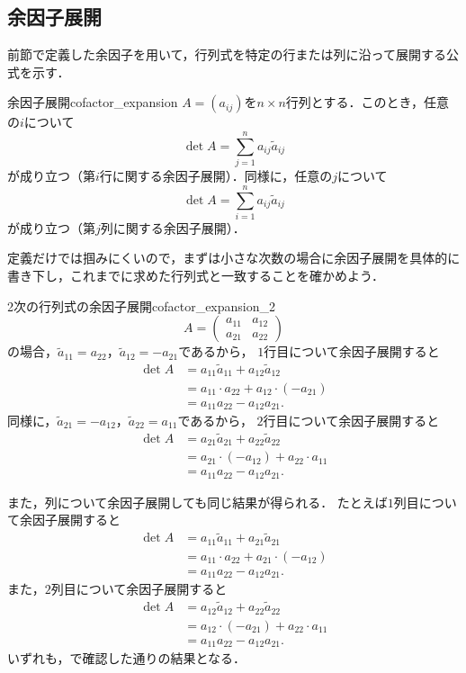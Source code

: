 \subsection{余因子展開}

前節で定義した余因子を用いて，行列式を特定の行または列に沿って展開する公式を示す．


\begin{prop}{余因子展開}{cofactor_expansion}
  $A = (a_{ij})$を$n \times n$行列とする．このとき，任意の$i$について
  \[
  \det A = \sum_{j=1}^{n} a_{ij} \tilde{a}_{ij}
  \]
  が成り立つ（第$i$行に関する余因子展開）．同様に，任意の$j$について
  \[
  \det A = \sum_{i=1}^{n} a_{ij} \tilde{a}_{ij}
  \]
  が成り立つ（第$j$列に関する余因子展開）．
\end{prop}

定義だけでは掴みにくいので，まずは小さな次数の場合に余因子展開を具体的に書き下し，これまでに求めた行列式と一致することを確かめよう．

\begin{example}{2次の行列式の余因子展開}{cofactor_expansion_2}
  \[
  A = \begin{pmatrix}
    a_{11} & a_{12} \\
    a_{21} & a_{22}
  \end{pmatrix}
  \]
  の場合，$\tilde{a}_{11} = a_{22}$，$\tilde{a}_{12} = -a_{21}$であるから，
  $1$行目について余因子展開すると
  \begin{align*}
    \det A
    &= a_{11}\tilde{a}_{11} + a_{12}\tilde{a}_{12} \\
    &= a_{11}\cdot a_{22} + a_{12}\cdot(-a_{21}) \\
    &= a_{11}a_{22} - a_{12}a_{21}.
  \end{align*}
  同様に，$\tilde{a}_{21} = -a_{12}$，$\tilde{a}_{22} = a_{11}$であるから，
  $2$行目について余因子展開すると
  \begin{align*}
    \det A
    &= a_{21}\tilde{a}_{21} + a_{22}\tilde{a}_{22} \\
    &= a_{21}\cdot(-a_{12}) + a_{22}\cdot a_{11} \\
    &= a_{11}a_{22} - a_{12}a_{21}.
  \end{align*}

  また，列について余因子展開しても同じ結果が得られる．
  たとえば$1$列目について余因子展開すると
  \begin{align*}
    \det A
    &= a_{11}\tilde{a}_{11} + a_{21}\tilde{a}_{21} \\
    &= a_{11}\cdot a_{22} + a_{21}\cdot(-a_{12}) \\
    &= a_{11}a_{22} - a_{12}a_{21}.
  \end{align*}
  また，$2$列目について余因子展開すると
  \begin{align*}
    \det A
    &= a_{12}\tilde{a}_{12} + a_{22}\tilde{a}_{22} \\
    &= a_{12}\cdot(-a_{21}) + a_{22}\cdot a_{11} \\
    &= a_{11}a_{22} - a_{12}a_{21}.
  \end{align*}
  いずれも，で確認した通りの結果となる．
\end{example}

